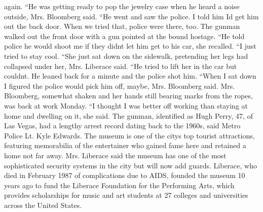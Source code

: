 \documentclass{article}
\begin{document}
\color[rgb]{0.40784313725490196,0.20784313725490197,0.03529411764705882}again. ``He was getting ready to pop the jewelry case when he heard a noise outside, \color[rgb]{0.7098039215686275,0.24705882352941178,0.8784313725490196}Mrs. Bloomberg said. ``He \color[rgb]{0.40784313725490196,0.20784313725490197,0.03529411764705882}went and saw the police. I told him Id get him out the back door. When we tried that, police were there, too. The gunman walked out the front door with a gun pointed at the bound hostage. ``He told police he would shoot me if they didnt let him get to his car, she recalled. ``I just tried to stay cool. ``She just sat down on the sidewalk, pretending \color[rgb]{0.7098039215686275,0.24705882352941178,0.8784313725490196}her \color[rgb]{0.40784313725490196,0.20784313725490197,0.03529411764705882}legs had collapsed \color[rgb]{0.7098039215686275,0.24705882352941178,0.8784313725490196}under her, Mrs. Liberace said. ``He \color[rgb]{0.40784313725490196,0.20784313725490197,0.03529411764705882}tried to lift \color[rgb]{0.7098039215686275,0.24705882352941178,0.8784313725490196}her in the \color[rgb]{0.40784313725490196,0.20784313725490197,0.03529411764705882}car but couldnt. He leaned back for a minute and the police shot him. ``When I sat down I figured the police would pick him off, maybe, \color[rgb]{0.7098039215686275,0.24705882352941178,0.8784313725490196}Mrs. Bloomberg said. Mrs. Bloomberg, \color[rgb]{0.40784313725490196,0.20784313725490197,0.03529411764705882}somewhat shaken and \color[rgb]{0.7098039215686275,0.24705882352941178,0.8784313725490196}her \color[rgb]{0.40784313725490196,0.20784313725490197,0.03529411764705882}hands still bearing marks from the ropes, was back at work Monday. ``I thought I was better off working than staying at home and dwelling on it, she said. The gunman, identified as Hugh Perry, 47, of Las Vegas, had a lengthy arrest record dating back to the 1960s, said Metro Police Lt. Kyle Edwards. The museum is one of the citys top tourist attractions, featuring memorabilia of the entertainer who gained fame here and retained a home not far away. \color[rgb]{0.7098039215686275,0.24705882352941178,0.8784313725490196}Mrs. Liberace said the \color[rgb]{0.40784313725490196,0.20784313725490197,0.03529411764705882}museum has one of the most sophisticated security systems in the city but will now add guards. Liberace, who died in February 1987 of complications due to AIDS, founded the museum 10 years ago to fund the Liberace Foundation for the Performing Arts, which provides scholarships for music and art students at 27 colleges and universities across the United States. 
\end{document}
